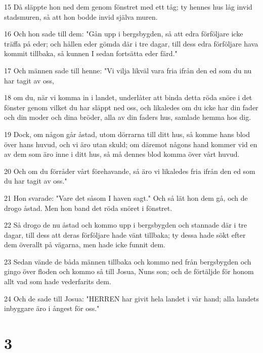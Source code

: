 \par 15 Då släppte hon ned dem genom fönstret med ett tåg; ty hennes hus låg invid stadsmuren, så att hon bodde invid själva muren.
\par 16 Och hon sade till dem: "Gån upp i bergsbygden, så att edra förföljare icke träffa på eder; och hållen eder gömda där i tre dagar, till dess edra förföljare hava kommit tillbaka, så kunnen I sedan fortsätta eder färd."
\par 17 Och männen sade till henne: "Vi vilja likväl vara fria ifrån den ed som du nu har tagit av oss,
\par 18 om du, när vi komma in i landet, underlåter att binda detta röda snöre i det fönster genom vilket du har släppt ned oss, och likaledes om du icke har din fader och din moder och dina bröder, alla av din faders hus, samlade hemma hos dig.
\par 19 Dock, om någon går åstad, utom dörrarna till ditt hus, så komme hans blod över hans huvud, och vi äro utan skuld; om däremot någons hand kommer vid en av dem som äro inne i ditt hus, så må dennes blod komma över vårt huvud.
\par 20 Och om du förråder vårt förehavande, så äro vi likaledes fria ifrån den ed som du har tagit av oss."
\par 21 Hon svarade: "Vare det såsom I haven sagt." Och så lät hon dem gå, och de drogo åstad. Men hon band det röda snöret i fönstret.
\par 22 Så drogo de nu åstad och kommo upp i bergsbygden och stannade där i tre dagar, till dess att deras förföljare hade vänt tillbaka; ty dessa hade sökt efter dem överallt på vägarna, men hade icke funnit dem.
\par 23 Sedan vände de båda männen tillbaka och kommo ned från bergsbygden och gingo över floden och kommo så till Josua, Nuns son; och de förtäljde för honom allt vad som hade vederfarits dem.
\par 24 Och de sade till Josua: "HERREN har givit hela landet i vår hand; alla landets inbyggare äro i ångest för oss."

\chapter{3}

